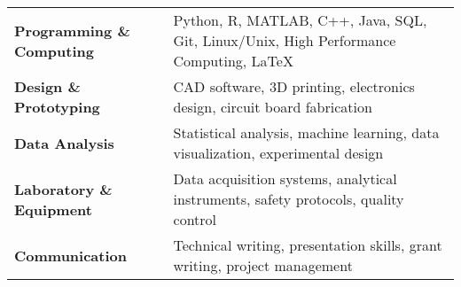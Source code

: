 \begin{tabularx}{\textwidth}{lX}
\textbf{Programming \& Computing} & Python, R, MATLAB, C++, Java, SQL, Git, Linux/Unix, High Performance Computing, \LaTeX \\
\textbf{Design \& Prototyping} & CAD software, 3D printing, electronics design, circuit board fabrication \\
\textbf{Data Analysis} & Statistical analysis, machine learning, data visualization, experimental design \\
\textbf{Laboratory \& Equipment} & Data acquisition systems, analytical instruments, safety protocols, quality control \\
\textbf{Communication} & Technical writing, presentation skills, grant writing, project management \\
\end{tabularx}